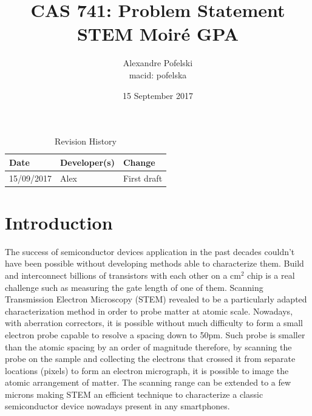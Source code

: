 \documentclass{article}
\title{CAS 741: Problem Statement\\STEM Moir{\'e} GPA}
\author{Alexandre Pofelski \\
macid: pofelska}
\date{15 September 2017}
\begin{document}
\maketitle
\clearpage

\begin{table}[hp]
\caption{Revision History} \label{TblRevisionHistory}
\begin{tabularx}{\textwidth}{llX}
\toprule
\textbf{Date} & \textbf{Developer(s)} & \textbf{Change}\\
\midrule
15/09/2017 & Alex & First draft\\
\bottomrule
\end{tabularx}
\end{table}

\clearpage
\tableofcontents
\clearpage

\section{Introduction}
The success of semiconductor devices application in the past decades couldn't have been possible without developing methods able to characterize them. Build and interconnect billions of transistors with each other on a cm$^{2}$ chip is a real challenge such as measuring the gate length of one of them. Scanning Transmission Electron Microscopy (STEM) revealed to be a particularly adapted characterization method in order to probe matter at atomic scale. Nowadays, with aberration correctors, it is possible without much difficulty to form a small electron probe capable to resolve a spacing down to 50pm. Such probe is smaller than the atomic spacing by an order of magnitude therefore, by scanning the probe on the sample and collecting the electrons that crossed it from separate locations (pixels) to form an electron micrograph, it is possible to image the atomic arrangement of matter. The scanning range can be extended to a few microns making STEM an efficient technique to characterize a classic semiconductor device nowadays present in any smartphones.\par \medskip
\end{document}
